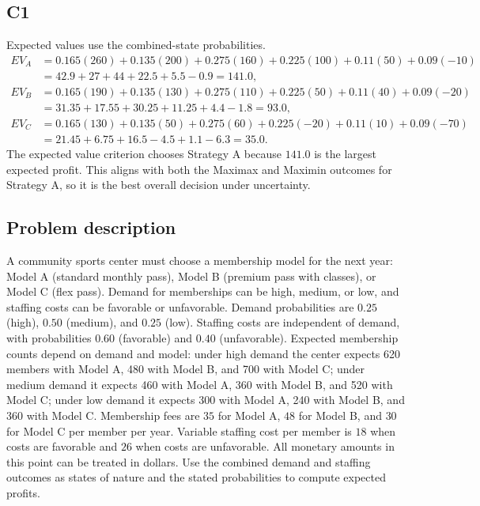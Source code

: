 \begin{ExamProblems}
		\subsection*{C1}
		Expected values use the combined-state probabilities.
		\[
		\begin{aligned}
		EV_A &= 0.165(260)+0.135(200)+0.275(160)+0.225(100)+0.11(50)+0.09(-10)\\
		&= 42.9+27+44+22.5+5.5-0.9=141.0,\\
		EV_B &= 0.165(190)+0.135(130)+0.275(110)+0.225(50)+0.11(40)+0.09(-20)\\
		&= 31.35+17.55+30.25+11.25+4.4-1.8=93.0,\\
		EV_C &= 0.165(130)+0.135(50)+0.275(60)+0.225(-20)+0.11(10)+0.09(-70)\\
		&= 21.45+6.75+16.5-4.5+1.1-6.3=35.0.
		\end{aligned}
		\]
		The expected value criterion chooses Strategy A because $141.0$ is the largest expected profit. This aligns with both the Maximax and Maximin outcomes for Strategy A, so it is the best overall decision under uncertainty.

		\item
		\subsection*{Problem description}
		A community sports center must choose a membership model for the next year: Model A (standard monthly pass),
		Model B (premium pass with classes), or Model C (flex pass). Demand for memberships can be high, medium, or low, and staffing costs can be favorable or unfavorable. Demand probabilities are $0.25$ (high), $0.50$ (medium), and $0.25$ (low). Staffing costs are independent of demand, with probabilities $0.60$ (favorable) and $0.40$ (unfavorable). Expected membership counts depend on demand and model: under high demand the center expects 620 members with Model A, 480 with Model B, and 700 with Model C; under medium demand it expects 460 with Model A, 360 with Model B, and 520 with Model C; under low demand it expects 300 with Model A, 240 with Model B, and 360 with Model C. Membership fees are $35$ for Model A, $48$ for Model B, and $30$ for Model C per member per year. Variable staffing cost per member is $18$ when costs are favorable and $26$ when costs are unfavorable. All monetary amounts in this point can be treated in dollars. Use the combined demand and staffing outcomes as states of nature and the stated probabilities to compute expected profits.


\end{ExamProblems}
